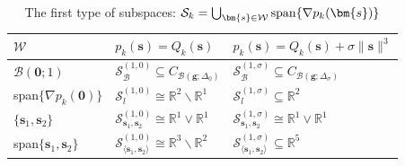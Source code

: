 \documentclass[colorlinks=true, linkcolor=blue, citecolor=blue, urlcolor=blue]{article}
\theoremstyle{plain}
\theoremstyle{definition}
\theoremstyle{remark}
\newcommand{\RR}{\mathbb{R}}
\begin{document}
\begin{table}[htbp]
    \caption{The first type of subspaces: $\mathcal{S}_k=\bigcup_{\bm{s}\in \mathcal{W}} {\rm span}\{\nabla p_k(\bm{s})\}$}
    \centering
    \begin{tabular}{m{3cm}<{\centering}m{4cm}<{\centering}m{4cm}<{\centering}}
    \toprule
     $\mathcal{W}$ & $p_k(\bm{s})=Q_k(\bm{s})$ & $p_k(\bm{s})=Q_k(\bm{s})+\sigma \|\bm{s}\|^3$ \\
    \midrule
       $\mathcal{B}(\bm 0;1)$  & $\mathcal{S}_{\mathcal{B}}^{(1,0)}\subseteq C_{\mathcal{B}(\bm g;\Delta_{0})}$  & $\mathcal{S}_{\mathcal{B}}^{(1,\sigma)}\subseteq C_{\mathcal{B}(\bm g;\Delta_{\sigma})}$ \\


        span$\{\nabla p_k(\bm 0)\}$ & $\mathcal{S}_{l}^{(1,0)}\cong\mathbb{R}^2\backslash \mathbb{R}^1$ &   $\mathcal{S}_{l}^{(1,\sigma)}\subseteq \RR^2$\\
     
        \vspace{1mm}
        $\{\bm s_1,\bm s_2\}$ &  \vspace{1mm}$\mathcal{S}_{\bm s_1,\bm s_2}^{(1,0)}\cong\mathbb{R}^1\vee\mathbb{R}^1$ & \vspace{1mm}$\mathcal{S}_{\bm s_1,\bm s_2}^{(1,\sigma)}\cong\mathbb{R}^1\vee\mathbb{R}^1$ \\

        span$\{\bm s_1,\bm s_2\}$ & $\mathcal{S}_{\langle\bm s_1,\bm s_2\rangle}^{(1,0)}\cong\mathbb{R}^3\backslash\mathbb{R}^2$ & $\mathcal{S}_{\langle\bm s_1,\bm s_2\rangle}^{(1,\sigma)}\subseteq\RR^5$
        \\
    \bottomrule
    \end{tabular}
    \label{tab:subspace-1}
\end{table}
\end{document}
